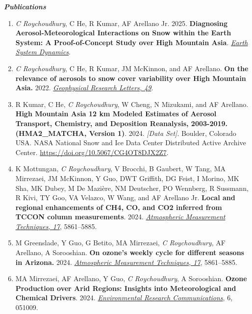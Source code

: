\documentclass[margin,line]{resume}
\begin{document}
\begin{resume}
		
		\textbf{\emph{\textcolor{sep}{Publications}}}
		\begin{enumerate}[topsep=1pt, partopsep=1pt, itemsep=0.5pt, parsep=0.1pt, leftmargin=15pt,label=\arabic*.]
			
			\item \textit{C Roychoudhury}, C He, R Kumar, AF Arellano Jr. 2025.  \textbf{Diagnosing Aerosol-Meteorological Interactions on Snow within the Earth System: A Proof-of-Concept Study over High Mountain Asia}.  \emph{\href{16, 1237–1266, https://doi.org/10.5194/esd-16-1237-2025, 2025.}{Earth System Dynamics}}.
			
			\item \textit{C Roychoudhury}, C He, R Kumar, JM McKinnon, and AF Arellano. \textbf{On the relevance of aerosols to snow cover variability over High Mountain Asia.} 2022.  \href{https://doi.org/10.1029/2022GL099317}{\textit{Geophysical Research Letters, 49}}.
			
			\item R Kumar, C He, \textit{C Roychoudhury}, W Cheng, N Mizukami, and AF Arellano. 
			\textbf{High Mountain Asia 12 km Modeled Estimates of Aerosol Transport, Chemistry, and Deposition Reanalysis, 2003-2019. (HMA2\_MATCHA, Version 1)}. 2024. \textit{[Data Set]}. Boulder, Colorado USA. NASA National Snow and Ice Data Center Distributed Active Archive Center. \url{https://doi.org/10.5067/CG4OT8DJX2Z7}.
			
			\item K Mottungan, \textit{C Roychoudhury}, V Brocchi, B Gaubert, W Tang, MA Mirrezaei, JM McKinnon, Y Guo, DWT Griffith, DG Feist, I Morino, MK Sha, MK Dubey, M De Mazière, NM Deutscher, PO Wennberg, R Sussmann, R Kivi, TY Goo, VA Velazco, W Wang, and AF Arellano Jr. \textbf{Local and regional enhancements of CH4, CO, and CO2 inferred from TCCON column measurements}. 2024.  \href{https://doi.org/10.5194/amt-17-5861-2024}{\textit{Atmospheric Measurement Techniques, 17}}, 5861–5885.
			
			\item M Greenslade, Y Guo, G Betito, MA Mirrezaei, \textit{C Roychoudhury}, AF Arellano, A Sorooshian. \textbf{On ozone's weekly cycle for different seasons in Arizona.} 2024. \href{https://doi.org/10.5194/amt-17-5861-2024}{\textit{Atmospheric Measurement Techniques, 17}}, 5861–5885.
			
			\item MA Mirrezaei, AF Arellano, Y Guo, \textit{C Roychoudhury}, A Sorooshian. \textbf{Ozone Production over Arid Regions: Insights into Meteorological and
				Chemical Drivers}. 2024.  \href{https://10.1088/2515-7620/ad484c}{\textit{Environmental Research Communications}}, 6, 051009.
			

\end{enumerate}
\end{resume}
\end{document}
